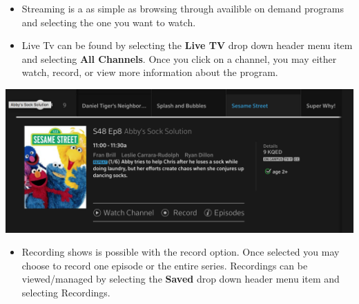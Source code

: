 \documentclass[a4paper, 11pt]{article}
\begin{document}
\begin{itemize}
  \item Streaming is a as simple as browsing through availible on demand 
  programs and selecting the one you want to watch.
  \item Live Tv can be found by selecting the \textbf{Live TV} drop down 
  header menu item and selecting \textbf{All Channels}.  Once you click
  on a channel, you may either watch, record, or view more information
  about the program.
\end{itemize}
\includegraphics[width=\linewidth, keepaspectratio]{seas.png}
\begin{itemize}
  \item Recording shows is possible with the record option.  Once selected
  you may choose to record one episode or the entire series.  Recordings 
  can be viewed/managed by selecting the \textbf{Saved} drop down header
  menu item and selecting Recordings.
\end{itemize}
\end{document}
